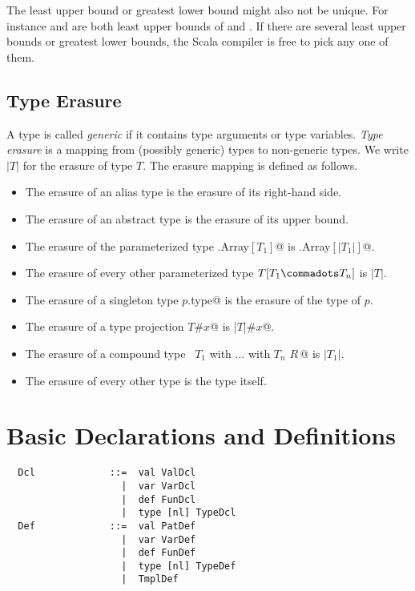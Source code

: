 The least upper bound or greatest lower bound might also not be
unique. For instance  and  are both
least upper bounds of  and . If there are several
least upper bounds or greatest lower bounds, the Scala compiler is
free to pick any one of them.

\section{Type Erasure}
\label{sec:erasure}

A type is called {\em generic} if it contains type arguments or type variables.
{\em Type erasure} is a mapping from (possibly generic) types to
non-generic types. We write $|T|$ for the erasure of type $T$.
The erasure mapping is defined as follows.
\begin{itemize}
\item The erasure of an alias type is the erasure of its right-hand side. %
\item The erasure of an abstract type is the erasure of its upper bound.
\item The erasure of the parameterized type \lstinline@scala.Array$[T_1]$@ is
 \lstinline@scala.Array$[|T_1|]$@.
 \item The erasure of every other parameterized type $T[T_1 \commadots T_n]$ is $|T|$.
\item The erasure of a singleton type \lstinline@$p$.type@ is the 
      erasure of the type of $p$.
\item The erasure of a type projection \lstinline@$T$#$x$@ is \lstinline@|$T$|#$x$@.
\item The erasure of a compound type ~\lstinline@$T_1$ with $\ldots$ with $T_n$ {$R\,$}@ 
      is $|T_1|$.
\item The erasure of every other type is the type itself.
\end{itemize}

\chapter{Basic Declarations and Definitions}
\label{sec:defs}

\syntax\begin{lstlisting}
  Dcl             ::=  val ValDcl
                    |  var VarDcl
                    |  def FunDcl
                    |  type [nl] TypeDcl
  Def             ::=  val PatDef 
                    |  var VarDef 
                    |  def FunDef 
                    |  type [nl] TypeDef 
                    |  TmplDef
\end{lstlisting}

